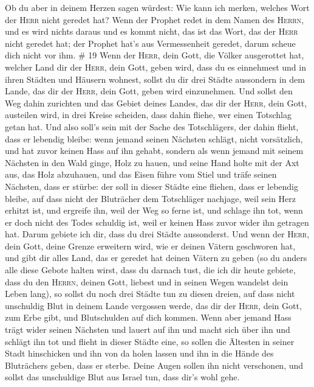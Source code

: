  Ob du aber in deinem Herzen sagen würdest: Wie kann ich
merken, welches Wort der \textsc{Herr} nicht geredet hat?
 Wenn der Prophet redet in dem Namen des \textsc{Herrn},
und es wird nichts daraus und es kommt nicht, das ist das Wort, das der
\textsc{Herr} nicht geredet hat; der Prophet hat's aus Vermessenheit
geredet, darum scheue dich nicht vor ihm. \# 19  Wenn der
\textsc{Herr}, dein Gott, die Völker ausgerottet hat, welcher Land dir
der \textsc{Herr}, dein Gott, geben wird, dass du es einnehmest und in
ihren Städten und Häusern wohnest,  sollst du dir drei
Städte aussondern in dem Lande, das dir der \textsc{Herr}, dein Gott,
geben wird einzunehmen.  Und sollst den Weg dahin
zurichten und das Gebiet deines Landes, das dir der \textsc{Herr}, dein
Gott, austeilen wird, in drei Kreise scheiden, dass dahin fliehe, wer
einen Totschlag getan hat.  Und also soll's sein mit der
Sache des Totschlägers, der dahin flieht, dass er lebendig bleibe: wenn
jemand seinen Nächsten schlägt, nicht vorsätzlich, und hat zuvor keinen
Hass auf ihn gehabt,  sondern als wenn jemand mit seinem
Nächsten in den Wald ginge, Holz zu hauen, und seine Hand holte mit der
Axt aus, das Holz abzuhauen, und das Eisen führe vom Stiel und träfe
seinen Nächsten, dass er stürbe: der soll in dieser Städte eine fliehen,
dass er lebendig bleibe,  auf dass nicht der Bluträcher
dem Totschläger nachjage, weil sein Herz erhitzt ist, und ergreife ihn,
weil der Weg so ferne ist, und schlage ihn tot, wenn er doch nicht des
Todes schuldig ist, weil er keinen Hass zuvor wider ihn getragen hat.
 Darum gebiete ich dir, dass du drei Städte aussonderst.
 Und wenn der \textsc{Herr}, dein Gott, deine Grenze
erweitern wird, wie er deinen Vätern geschworen hat, und gibt dir alles
Land, das er geredet hat deinen Vätern zu geben  (so du
anders alle diese Gebote halten wirst, dass du darnach tust, die ich dir
heute gebiete, dass du den \textsc{Herrn}, deinen Gott, liebest und in
seinen Wegen wandelst dein Leben lang), so sollst du noch drei Städte
tun zu diesen dreien,  auf dass nicht unschuldig Blut in
deinem Lande vergossen werde, das dir der \textsc{Herr}, dein Gott, zum
Erbe gibt, und Blutschulden auf dich kommen.  Wenn aber
jemand Hass trägt wider seinen Nächsten und lauert auf ihn und macht
sich über ihn und schlägt ihn tot und flieht in dieser Städte eine,
 so sollen die Ältesten in seiner Stadt hinschicken und
ihn von da holen lassen und ihn in die Hände des Bluträchers geben, dass
er sterbe.  Deine Augen sollen ihn nicht verschonen, und
sollst das unschuldige Blut aus Israel tun, dass dir's wohl gehe.

